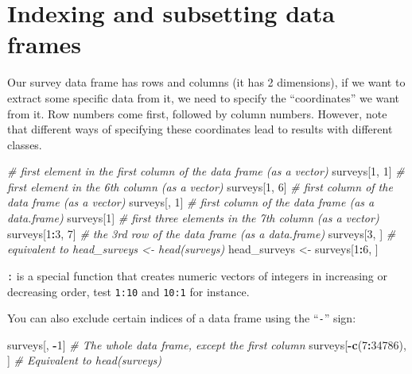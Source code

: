 \documentclass[]{book}
\newenvironment{Shaded}{\begin{snugshade}}{\end{snugshade}}
\newcommand{\KeywordTok}[1]{\textcolor[rgb]{0.13,0.29,0.53}{\textbf{#1}}}
\newcommand{\DecValTok}[1]{\textcolor[rgb]{0.00,0.00,0.81}{#1}}
\newcommand{\StringTok}[1]{\textcolor[rgb]{0.31,0.60,0.02}{#1}}
\newcommand{\CommentTok}[1]{\textcolor[rgb]{0.56,0.35,0.01}{\textit{#1}}}
\newcommand{\OperatorTok}[1]{\textcolor[rgb]{0.81,0.36,0.00}{\textbf{#1}}}
\newcommand{\NormalTok}[1]{#1}
\begin{document}
\section{Indexing and subsetting data
frames}\label{indexing-and-subsetting-data-frames}

Our survey data frame has rows and columns (it has 2 dimensions), if we
want to extract some specific data from it, we need to specify the
``coordinates'' we want from it. Row numbers come first, followed by
column numbers. However, note that different ways of specifying these
coordinates lead to results with different classes.

\begin{Shaded}
\begin{Highlighting}[]
\CommentTok{# first element in the first column of the data frame (as a vector)}
\NormalTok{surveys[}\DecValTok{1}\NormalTok{, }\DecValTok{1}\NormalTok{]   }
\CommentTok{# first element in the 6th column (as a vector)}
\NormalTok{surveys[}\DecValTok{1}\NormalTok{, }\DecValTok{6}\NormalTok{]   }
\CommentTok{# first column of the data frame (as a vector)}
\NormalTok{surveys[, }\DecValTok{1}\NormalTok{]    }
\CommentTok{# first column of the data frame (as a data.frame)}
\NormalTok{surveys[}\DecValTok{1}\NormalTok{]      }
\CommentTok{# first three elements in the 7th column (as a vector)}
\NormalTok{surveys[}\DecValTok{1}\OperatorTok{:}\DecValTok{3}\NormalTok{, }\DecValTok{7}\NormalTok{] }
\CommentTok{# the 3rd row of the data frame (as a data.frame)}
\NormalTok{surveys[}\DecValTok{3}\NormalTok{, ]    }
\CommentTok{# equivalent to head_surveys <- head(surveys)}
\NormalTok{head_surveys <-}\StringTok{ }\NormalTok{surveys[}\DecValTok{1}\OperatorTok{:}\DecValTok{6}\NormalTok{, ] }
\end{Highlighting}
\end{Shaded}

\texttt{:} is a special function that creates numeric vectors of
integers in increasing or decreasing order, test \texttt{1:10} and
\texttt{10:1} for instance.

You can also exclude certain indices of a data frame using the
``\texttt{-}'' sign:

\begin{Shaded}
\begin{Highlighting}[]
\NormalTok{surveys[, }\OperatorTok{-}\DecValTok{1}\NormalTok{]          }\CommentTok{# The whole data frame, except the first column}
\NormalTok{surveys[}\OperatorTok{-}\KeywordTok{c}\NormalTok{(}\DecValTok{7}\OperatorTok{:}\DecValTok{34786}\NormalTok{), ] }\CommentTok{# Equivalent to head(surveys)}
\end{Highlighting}
\end{Shaded}
\end{document}
